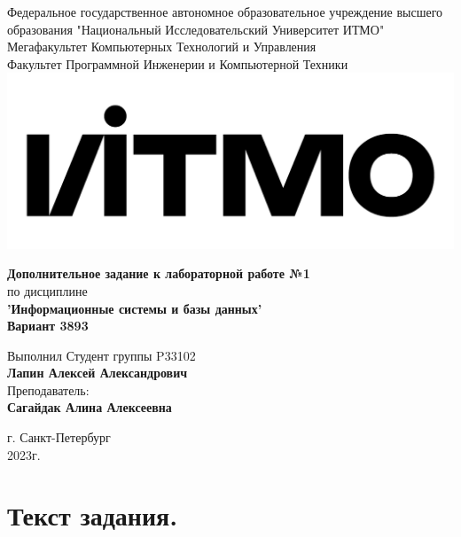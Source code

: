 \documentclass[12pt,onecolumn]{article}
\begin{document}
\setcounter{tocdepth}{4}
\begin{center}
    Федеральное государственное автономное образовательное учреждение высшего образования "Национальный Исследовательский Университет ИТМО"\\ 
    Мегафакультет Компьютерных Технологий и Управления\\
    Факультет Программной Инженерии и Компьютерной Техники \\
    \includegraphics[scale=0.3]{image/itmo.jpg} %
\end{center}
\vspace{1cm}


\begin{center}
    \textbf{Дополнительное задание к лабораторной работе №1}\\
    по дисциплине\\
    \textbf{'Информационные системы и базы данных'}\\
    \textbf{Вариант 3893}
\end{center}

\vspace{2cm}

\begin{flushright}
  Выполнил Студент  группы P33102\\
  \textbf{Лапин Алексей Александрович}\\
  Преподаватель: \\
  \textbf{Сагайдак Алина Алексеевна}\\
\end{flushright}

\vspace{6cm}
\begin{center}
    г. Санкт-Петербург\\
    2023г.
\end{center}

\newpage
\tableofcontents
\newpage

\section{Текст задания.}
\end{document}
